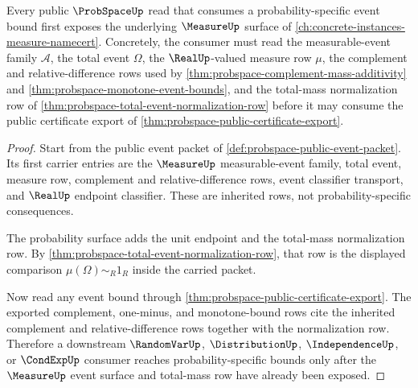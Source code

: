 \begin{theorem}
\label{thm:probspace-measure-dependency-route}
Every public $\ProbSpaceUp$ read that consumes a probability-specific event bound first exposes the underlying $\MeasureUp$ surface of \autoref{ch:concrete-instances-measure-namecert}. Concretely, the consumer must read the measurable-event family $\mathcal A$, the total event $\Omega$, the $\RealUp$-valued measure row $\mu$, the complement and relative-difference rows used by \autoref{thm:probspace-complement-mass-additivity} and \autoref{thm:probspace-monotone-event-bounds}, and the total-mass normalization row of \autoref{thm:probspace-total-event-normalization-row} before it may consume the public certificate export of \autoref{thm:probspace-public-certificate-export}.
\end{theorem}
\begin{proof}
Start from the public event packet of \autoref{def:probspace-public-event-packet}. Its first carrier entries are the $\MeasureUp$ measurable-event family, total event, measure row, complement and relative-difference rows, event classifier transport, and $\RealUp$ endpoint classifier. These are inherited rows, not probability-specific consequences.

The probability surface adds the unit endpoint and the total-mass normalization row. By \autoref{thm:probspace-total-event-normalization-row}, that row is the displayed comparison $\mu(\Omega)\sim_R1_R$ inside the carried packet.

Now read any event bound through \autoref{thm:probspace-public-certificate-export}. The exported complement, one-minus, and monotone-bound rows cite the inherited complement and relative-difference rows together with the normalization row. Therefore a downstream $\RandomVarUp$, $\DistributionUp$, $\IndependenceUp$, or $\CondExpUp$ consumer reaches probability-specific bounds only after the $\MeasureUp$ event surface and total-mass row have already been exposed.
\end{proof}

